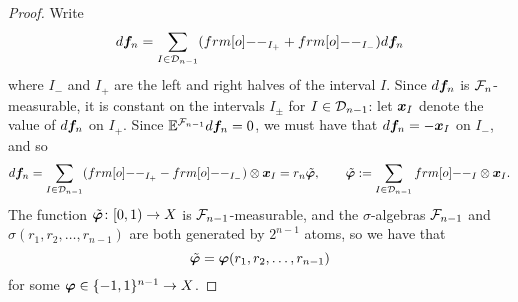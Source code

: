   \begin{proof}
    Write
    \begin{equation*}
      d\mb{f}_{n} = \sum_{I \in \mc{D}_{n-1}} (\1_{I_+} + \1_{I_{-}}) d\mb{f}_{n}
    \end{equation*}
    where $I_-$ and $I_+$ are the left and right halves of the interval $I$.
    Since $d\bm{f}_{n}$ is $\mathcal{F}_{n}$-measurable, it is constant on the intervals $I_\pm$ for $I \in \mathcal{D}_{n-1}$: let $\bm{x}_{I}$ denote the value of $d\bm{f}_{n}$ on $I_+$.
    Since $\mathbb{E}^{\mathcal{F}_{n-1}}d\bm{f}_{n} = 0$, we must have that $d\bm{f}_{n} = -\bm{x}_{I}$ on $I_{-}$, and so
    \begin{equation*}
      d\mb{f}_{n} = \sum_{I \in \mc{D}_{n-1}} (\1_{I_+} - \1_{I_{-}}) \otimes \mb{x}_{I} = r_{n} \tilde{\mb{\phi}}, \qquad \tilde{\mb{\phi}} := \sum_{I \in \mc{D}_{n-1}} \1_{I} \otimes \mb{x}_{I}.
    \end{equation*}
    The function $\tilde{\bm{\varphi}} \colon [0,1) \to X$ is $\mathcal{F}_{n-1}$-measurable, and the $\sigma$-algebras $\mathcal{F}_{n-1}$ and $\sigma(r_{1}, r_{2}, \ldots, r_{n-1})$ are both generated by $2^{n-1}$ atoms, so we have that
    \begin{equation*}
      \tilde{\bm{\varphi}} = \bm{\varphi}(r_{1}, r_{2}, \ldots, r_{n-1})
    \end{equation*}
    for some $\bm{\varphi} \in \{-1,1\}^{n-1} \to X$.
  \end{proof}

